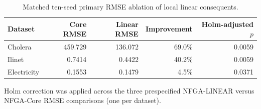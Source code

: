 \begin{table}[t]
\centering
\caption{Matched ten-seed primary RMSE ablation of local linear consequents.}
\label{tab:nfga_primary_rmse_ablation}
\begin{tabular}{lrrrr}
\toprule
Dataset & Core RMSE & Linear RMSE & Improvement & Holm-adjusted $p$ \\
\midrule
Cholera & 459.729 & 136.072 & 69.0\% & 0.0059 \\
Ilinet & 0.7414 & 0.4422 & 40.2\% & 0.0059 \\
Electricity & 0.1553 & 0.1479 & 4.5\% & 0.0371 \\
\bottomrule
\end{tabular}
\begin{minipage}{0.96\linewidth}
\footnotesize Holm correction was applied across the three prespecified NFGA-LINEAR versus NFGA-Core RMSE comparisons (one per dataset).
\end{minipage}
\end{table}
